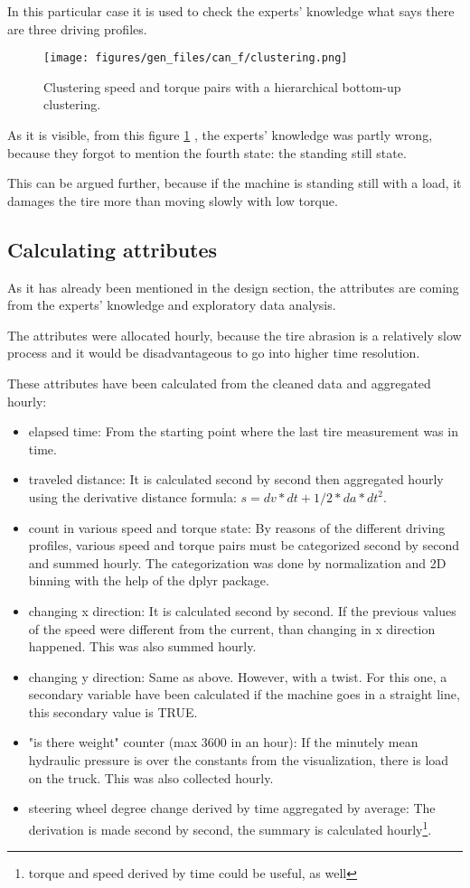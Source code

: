 	In this particular case it is used to check the experts' knowledge what says there are three driving profiles.
	\begin{figure}[H]
			\centering
			\texttt{[image: figures/gen\_files/can\_f/clustering.png]}
			\caption{Clustering speed and torque pairs with a hierarchical bottom-up clustering.\label{fig:clustering}} 
	\end{figure}
	As it is visible, from this figure \ref{fig:clustering} , the experts' knowledge was partly wrong, because they forgot to mention the fourth state: the standing still state.

	This can be argued further, because if the machine is standing still with a load, it damages the tire more than moving slowly with low torque.
\newpage
\subsection{Calculating attributes}
As it has already been mentioned in the design section, the attributes are coming from the experts' knowledge and exploratory data analysis.

The attributes were allocated hourly, because the tire abrasion is a relatively slow process and it would be disadvantageous to go into higher time resolution.

These attributes have been calculated from the cleaned data and aggregated hourly:
	\begin{itemize}
		\item{elapsed time:} From the starting point where the last tire measurement was in time.
		\item{traveled distance:} It is calculated second by second then aggregated hourly using the derivative distance formula: $s = dv*dt + 1/2*da*dt^2$.
		\item{count in various speed and torque state:} By reasons of the different driving profiles, various speed and torque pairs must be categorized second by second and summed hourly. The categorization was done by normalization and 2D binning with the help of the dplyr package.
		\item{changing x direction:} It is calculated second by second. If the previous values of the speed were different from the current, than changing in x direction happened. This was also summed hourly.
		\item{changing y direction:} Same as above. However, with a twist. For this one, a secondary variable have been calculated if the machine goes in a straight line, this secondary value is TRUE.
		\item{"is there weight" counter (max 3600 in an hour):} If the minutely mean hydraulic pressure is over the constants from the visualization, there is load on the truck. This was also collected hourly.
		\item{steering wheel degree change derived by time aggregated by average:} The derivation is made second by second, the summary is calculated hourly\footnote{torque and speed derived by time could be useful, as well}.
	\end{itemize}
